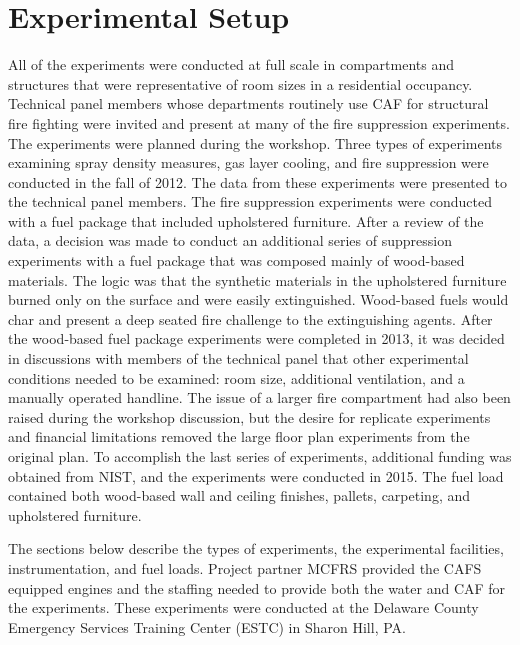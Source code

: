 \documentclass[12pt,oneside]{book}
\begin{document}
\chapter{Experimental Setup}

All of the experiments were conducted at full scale in compartments and structures that were representative of room sizes in a residential occupancy. Technical panel members whose departments routinely use CAF for structural fire fighting were invited and present at many of the fire suppression experiments. The experiments were planned during the workshop.  Three types of experiments examining spray density measures, gas layer cooling, and fire suppression were conducted in the fall of 2012. The data from these experiments were presented to the technical panel members. The fire suppression experiments were conducted with a fuel package that included upholstered furniture. After a review of the data, a decision was made to conduct an additional series of suppression experiments with a fuel package that was composed mainly of wood-based materials. The logic was that the synthetic materials in the upholstered furniture burned only on the surface and were easily extinguished. Wood-based fuels would char and present a deep seated fire challenge to the extinguishing agents.  After the wood-based fuel package experiments were completed in 2013, it was decided in discussions with members of the technical panel that other experimental conditions needed to be examined: room size, additional ventilation, and a manually operated handline. The issue of a larger fire compartment had also been raised during the workshop discussion, but the desire for replicate experiments and financial limitations removed the large floor plan experiments from the original plan. To accomplish the last series of experiments, additional funding was obtained from NIST, and the experiments were conducted in 2015. The fuel load contained both wood-based wall and ceiling finishes, pallets, carpeting, and upholstered furniture.  

The sections below describe the types of experiments, the experimental facilities, instrumentation, and fuel loads. Project partner MCFRS provided the CAFS equipped engines and the staffing needed to provide both the water and CAF for the experiments. These experiments were conducted at the Delaware County Emergency Services Training Center (ESTC) in Sharon Hill, PA.
\end{document}
